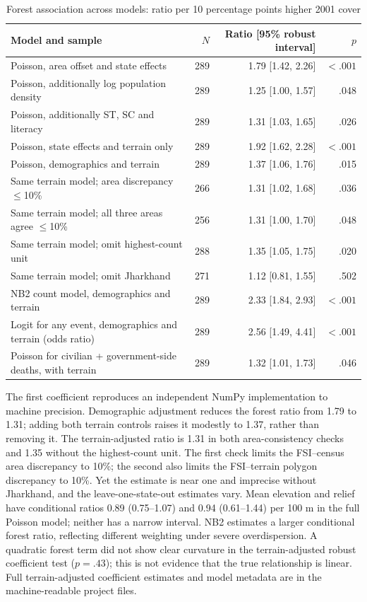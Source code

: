 \documentclass[11pt,a4paper]{article}
\begin{document}
\begin{table}[htbp]
\centering\small
\caption{Forest association across models: ratio per 10 percentage points higher 2001 cover}
\begin{tabular}{p{7.3cm}rrr}
\toprule
Model and sample & $N$ & Ratio [95\% robust interval] & $p$\\
\midrule
Poisson, area offset and state effects & 289 & 1.79 [1.42, 2.26] & $<.001$\\
Poisson, additionally log population density & 289 & 1.25 [1.00, 1.57] & .048\\
Poisson, additionally ST, SC and literacy & 289 & 1.31 [1.03, 1.65] & .026\\
Poisson, state effects and terrain only & 289 & 1.92 [1.62, 2.28] & $<.001$\\
Poisson, demographics and terrain & 289 & 1.37 [1.06, 1.76] & .015\\
Same terrain model; area discrepancy $\leq$10\% & 266 & 1.31 [1.02, 1.68] & .036\\
Same terrain model; all three areas agree $\leq$10\% & 256 & 1.31 [1.00, 1.70] & .048\\
Same terrain model; omit highest-count unit & 288 & 1.35 [1.05, 1.75] & .020\\
Same terrain model; omit Jharkhand & 271 & 1.12 [0.81, 1.55] & .502\\
NB2 count model, demographics and terrain & 289 & 2.33 [1.84, 2.93] & $<.001$\\
Logit for any event, demographics and terrain (odds ratio) & 289 & 2.56 [1.49, 4.41] & $<.001$\\
Poisson for civilian + government-side deaths, with terrain & 289 & 1.32 [1.01, 1.73] & .046\\
\bottomrule
\end{tabular}
\label{tab:models}
\end{table}

The first coefficient reproduces an independent NumPy implementation to machine precision. Demographic adjustment reduces the forest ratio from 1.79 to 1.31; adding both terrain controls raises it modestly to 1.37, rather than removing it. The terrain-adjusted ratio is 1.31 in both area-consistency checks and 1.35 without the highest-count unit. The first check limits the FSI--census area discrepancy to 10\%; the second also limits the FSI--terrain polygon discrepancy to 10\%. Yet the estimate is near one and imprecise without Jharkhand, and the leave-one-state-out estimates vary. Mean elevation and relief have conditional ratios 0.89 (0.75--1.07) and 0.94 (0.61--1.44) per 100 m in the full Poisson model; neither has a narrow interval. NB2 estimates a larger conditional forest ratio, reflecting different weighting under severe overdispersion. A quadratic forest term did not show clear curvature in the terrain-adjusted robust coefficient test ($p=.43$); this is not evidence that the true relationship is linear. Full terrain-adjusted coefficient estimates and model metadata are in the machine-readable project files.
\end{document}
